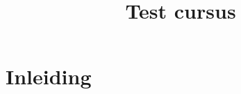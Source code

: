 \documentclass{xourse}
\title{Test cursus}
\begin{document}
\begin{abstract}
\end{abstract}
\maketitle

\part{Inleiding}
\end{document}
